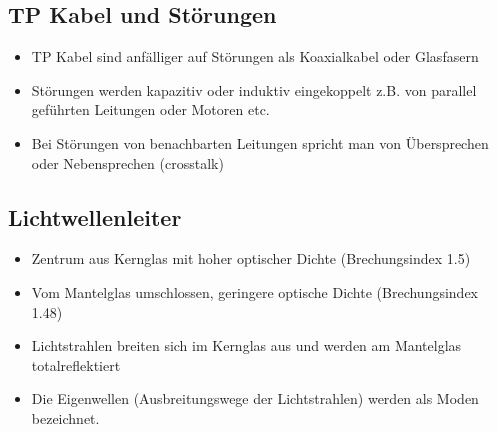 \subsection{TP Kabel und Störungen}{
    \begin{itemize}[noitemsep]
        \item TP Kabel sind anfälliger auf Störungen als Koaxialkabel oder Glasfasern
        \item Störungen werden kapazitiv oder induktiv eingekoppelt z.B. von parallel geführten Leitungen oder Motoren etc.
        \item Bei Störungen von benachbarten Leitungen spricht man von Übersprechen oder
              Nebensprechen (crosstalk)
    \end{itemize}}
\WhiteSpace

\subsection{Lichtwellenleiter}{
    { \begin{itemize}[noitemsep]
                \item Zentrum aus Kernglas mit hoher optischer Dichte (Brechungsindex 1.5)
                \item Vom Mantelglas umschlossen, geringere optische Dichte (Brechungsindex 1.48)
                \item Lichtstrahlen breiten sich im Kernglas aus und werden am Mantelglas totalreflektiert
                \item Die Eigenwellen (Ausbreitungswege der Lichtstrahlen) werden als Moden bezeichnet.
            \end{itemize}}
}